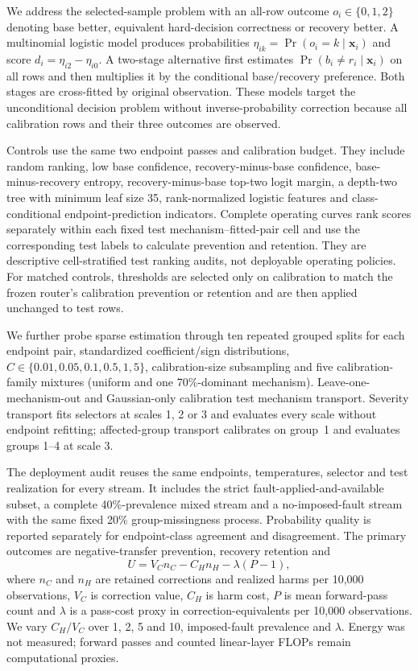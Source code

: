 \documentclass[11pt]{article}
\begin{document}
We address the selected-sample problem with an all-row outcome $o_i\in\{0,1,2\}$ denoting base better, equivalent hard-decision correctness or recovery better. A multinomial logistic model produces probabilities $\eta_{ik}=\Pr(o_i=k\mid\mathbf x_i)$ and score $d_i=\eta_{i2}-\eta_{i0}$. A two-stage alternative first estimates $\Pr(b_i\ne r_i\mid\mathbf x_i)$ on all rows and then multiplies it by the conditional base/recovery preference. Both stages are cross-fitted by original observation. These models target the unconditional decision problem without inverse-probability correction because all calibration rows and their three outcomes are observed.

Controls use the same two endpoint passes and calibration budget. They include random ranking, low base confidence, recovery-minus-base confidence, base-minus-recovery entropy, recovery-minus-base top-two logit margin, a depth-two tree with minimum leaf size 35, rank-normalized logistic features and class-conditional endpoint-prediction indicators. Complete operating curves rank scores separately within each fixed test mechanism--fitted-pair cell and use the corresponding test labels to calculate prevention and retention. They are descriptive cell-stratified test ranking audits, not deployable operating policies. For matched controls, thresholds are selected only on calibration to match the frozen router's calibration prevention or retention and are then applied unchanged to test rows.

We further probe sparse estimation through ten repeated grouped splits for each endpoint pair, standardized coefficient/sign distributions, $C\in\{0.01,0.05,0.1,0.5,1,5\}$, calibration-size subsampling and five calibration-family mixtures (uniform and one 70\%-dominant mechanism). Leave-one-mechanism-out and Gaussian-only calibration test mechanism transport. Severity transport fits selectors at scales 1, 2 or 3 and evaluates every scale without endpoint refitting; affected-group transport calibrates on group~1 and evaluates groups 1--4 at scale 3.

The deployment audit reuses the same endpoints, temperatures, selector and test realization for every stream. It includes the strict fault-applied-and-available subset, a complete 40\%-prevalence mixed stream and a no-imposed-fault stream with the same fixed 20\% group-missingness process. Probability quality is reported separately for endpoint-class agreement and disagreement. The primary outcomes are negative-transfer prevention, recovery retention and
\begin{equation}
U=V_C n_C-C_H n_H-\lambda(P-1),
\label{eq:utility}
\end{equation}
where $n_C$ and $n_H$ are retained corrections and realized harms per 10,000 observations, $V_C$ is correction value, $C_H$ is harm cost, $P$ is mean forward-pass count and $\lambda$ is a pass-cost proxy in correction-equivalents per 10,000 observations. We vary $C_H/V_C$ over 1, 2, 5 and 10, imposed-fault prevalence and $\lambda$. Energy was not measured; forward passes and counted linear-layer FLOPs remain computational proxies.
\end{document}
